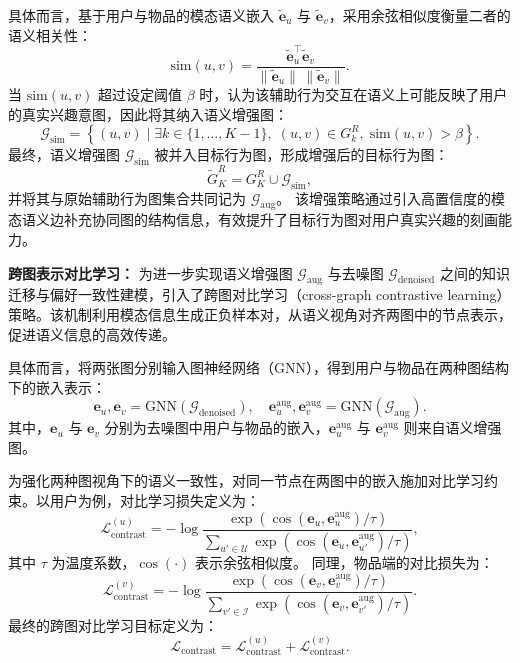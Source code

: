具体而言，基于用户与物品的模态语义嵌入 $\widetilde{\mathbf{e}}_u$ 与 $\widetilde{\mathbf{e}}_v$，采用余弦相似度衡量二者的语义相关性：
\begin{equation}
\mathrm{sim}(u, v) = 
\frac{
\widetilde{\mathbf{e}}_u^\top \widetilde{\mathbf{e}}_v
}{
\|\widetilde{\mathbf{e}}_u\| \, \|\widetilde{\mathbf{e}}_v\|
}.
\end{equation}
当 $\mathrm{sim}(u, v)$ 超过设定阈值 $\beta$ 时，认为该辅助行为交互在语义上可能反映了用户的真实兴趣意图，因此将其纳入语义增强图：
\begin{equation}
\mathcal{G}_{\mathrm{sim}} =
\left\{
(u, v)
\mid
\exists k \in \{1, \ldots, K-1\},\;
(u, v) \in G^R_k,\;
\mathrm{sim}(u, v) > \beta
\right\}.
\end{equation}
最终，语义增强图 $\mathcal{G}_{\mathrm{sim}}$ 被并入目标行为图，形成增强后的目标行为图：
\begin{equation}
\widetilde{G}^R_K = G^R_K \cup \mathcal{G}_{\mathrm{sim}},
\end{equation}
并将其与原始辅助行为图集合共同记为 $\mathcal{G}_{\mathrm{aug}}$。  
该增强策略通过引入高置信度的模态语义边补充协同图的结构信息，有效提升了目标行为图对用户真实兴趣的刻画能力。

\textbf{跨图表示对比学习：}  
为进一步实现语义增强图 $\mathcal{G}_{\mathrm{aug}}$ 与去噪图 $\mathcal{G}_{\mathrm{denoised}}$ 之间的知识迁移与偏好一致性建模，引入了跨图对比学习（cross-graph contrastive learning）策略。该机制利用模态信息生成正负样本对，从语义视角对齐两图中的节点表示，促进语义信息的高效传递。

具体而言，将两张图分别输入图神经网络（GNN），得到用户与物品在两种图结构下的嵌入表示：
\begin{equation}
\mathbf{e}_u, \mathbf{e}_v = \mathrm{GNN}(\mathcal{G}_{\mathrm{denoised}}), \quad
\mathbf{e}_u^{\mathrm{aug}}, \mathbf{e}_v^{\mathrm{aug}} = \mathrm{GNN}(\mathcal{G}_{\mathrm{aug}}).
\end{equation}
其中，$\mathbf{e}_u$ 与 $\mathbf{e}_v$ 分别为去噪图中用户与物品的嵌入，$\mathbf{e}_u^{\mathrm{aug}}$ 与 $\mathbf{e}_v^{\mathrm{aug}}$ 则来自语义增强图。

为强化两种图视角下的语义一致性，对同一节点在两图中的嵌入施加对比学习约束。以用户为例，对比学习损失定义为：
\begin{equation}
\mathcal{L}_{\mathrm{contrast}}^{(u)} =
- \log
\frac{
\exp\!\left(
\cos(\mathbf{e}_u, \mathbf{e}_u^{\mathrm{aug}}) / \tau
\right)
}{
\sum\limits_{u' \in \mathcal{U}}
\exp\!\left(
\cos(\mathbf{e}_u, \mathbf{e}_{u'}^{\mathrm{aug}}) / \tau
\right)
},
\end{equation}
其中 $\tau$ 为温度系数，$\cos(\cdot)$ 表示余弦相似度。  
同理，物品端的对比损失为：
\begin{equation}
\mathcal{L}_{\mathrm{contrast}}^{(v)} =
- \log
\frac{
\exp\!\left(
\cos(\mathbf{e}_v, \mathbf{e}_v^{\mathrm{aug}}) / \tau
\right)
}{
\sum\limits_{v' \in \mathcal{I}}
\exp\!\left(
\cos(\mathbf{e}_v, \mathbf{e}_{v'}^{\mathrm{aug}}) / \tau
\right)
}.
\end{equation}
最终的跨图对比学习目标定义为：
\begin{equation}
\mathcal{L}_{\mathrm{contrast}} =
\mathcal{L}_{\mathrm{contrast}}^{(u)} +
\mathcal{L}_{\mathrm{contrast}}^{(v)}.
\end{equation}

